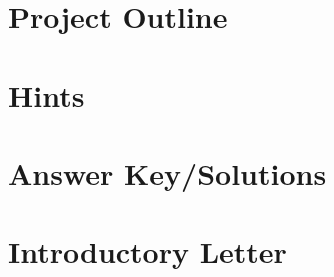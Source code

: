 \documentclass[12pt]{article}
\begin{document}
\tableofcontents
  \newpage

  \section{Project Outline}
  
  \newpage

  \section{Hints}
  
  \newpage

  \section{Answer Key/Solutions}
  
  \newpage

  \section{Introductory Letter}
  
\end{document}
